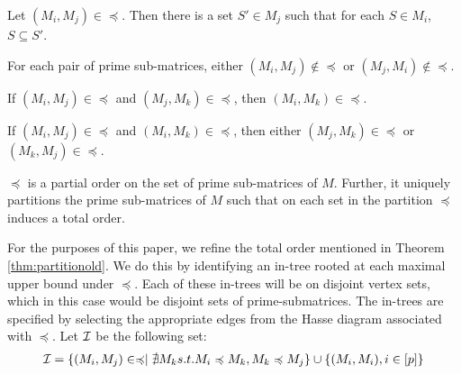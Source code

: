 \documentclass{llncs}
\def\cI{{\cal I}}
\begin{document}
\begin{lemma} \label{lem:containment}
Let $(M_i,M_j) \in \preccurlyeq$.  Then there is a set $S' \in M_j$ such that for each $S \in M_i$, $S \subseteq S'$. 
\end{lemma}
\begin{lemma}
For each pair of prime sub-matrices, either $(M_i,M_j) \not\in \preccurlyeq$ or $(M_j,M_i) \not\in \preccurlyeq$.
\end{lemma}
\begin{lemma}
If $(M_i,M_j) \in \preccurlyeq $ and $(M_j,M_k) \in \preccurlyeq$, then $(M_i,M_k) \in \preccurlyeq$.
\end{lemma}
\begin{lemma}
If $(M_i,M_j) \in \preccurlyeq$ and $(M_i,M_k) \in \preccurlyeq$, then
either $(M_j,M_k) \in \preccurlyeq$ or $(M_k,M_j) \in \preccurlyeq$. 
\end{lemma}
\begin{theorem} \label{thm:partitionold}
  $\preccurlyeq$ is a partial order on the set of prime sub-matrices
  of $M$.  Further, it uniquely partitions the prime sub-matrices of
  $M$ such that on each set in the partition $\preccurlyeq$ induces a
  total order.
\end{theorem}
For the purposes of this paper, we refine the total order mentioned in Theorem \ref{thm:partitionold}. We do
this by identifying an in-tree rooted at each maximal upper bound under $\preccurlyeq$.  Each of these in-trees
will be on disjoint vertex sets, which in this case would be disjoint sets of prime-submatrices.  The in-trees are 
specified by selecting the appropriate edges from the Hasse diagram associated with $\preccurlyeq$.
Let $\cI$ be the following set:
\begin{align*}
  \cI = \{ (M_i,M_j) \in \preccurlyeq \mid \nexists M_k s.t. M_i \preccurlyeq M_k, M_k \preccurlyeq M_j
  \} \cup \{ (M_i,M_i), i \in [p] \}
\end{align*}
\end{document}
